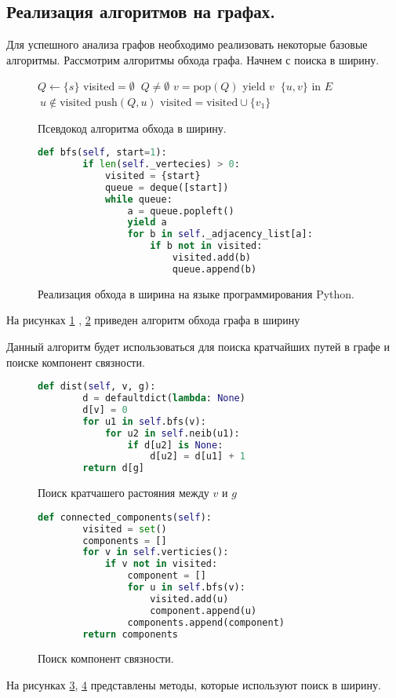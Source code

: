 \subsection{Реализация алгоритмов на графах.}
Для успешного анализа графов необходимо реализовать
некоторые базовые алгоритмы. 
Рассмотрим алгоритмы обхода графа. Начнем с поиска в ширину.
\begin{figure}[H] 
    \begin{algorithmic}
        \State $Q \gets \{s\}$ 
        \State visited$= \emptyset$
        \While $~Q \neq \emptyset$ 
        \State $v = \text{pop}(Q)$
        \State yield $v$
        \For $ ~\{u,v\}$ in $E$
        \If $~u \notin \text{visited}$ 
        \State $\text{push}(Q,u)$
        \State $\text{visited} = \text{visited} \cup \{v_1\}$
        \EndIf
        \EndFor
        \EndWhile
    \end{algorithmic}
    \caption{Псевдокод алгоритма обхода в ширину.}
    \label{psbfs}
\end{figure} 
\begin{figure}[H] 
\begin{lstlisting}[language=Python] 
    def bfs(self, start=1):
        if len(self._vertecies) > 0:
            visited = {start}
            queue = deque([start])
            while queue:
                a = queue.popleft()
                yield a
                for b in self._adjacency_list[a]:
                    if b not in visited:
                        visited.add(b)
                        queue.append(b)
\end{lstlisting}  
    \caption{Реализация обхода в ширина на языке программирования Python.}
    \label{sec:bfspy}
\end{figure} 
На рисунках \ref{psbfs} , \ref{sec:bfspy}
приведен алгоритм обхода графа в ширину

Данный алгоритм будет использоваться для поиска кратчайших путей в графе
и поиске компонент связности.
\begin{figure}[H] 
\begin{lstlisting}[language=Python] 
    def dist(self, v, g):
        d = defaultdict(lambda: None)
        d[v] = 0
        for u1 in self.bfs(v):
            for u2 in self.neib(u1):
                if d[u2] is None:
                    d[u2] = d[u1] + 1
        return d[g]
\end{lstlisting}  
    \caption{Поиск кратчашего растояния между $v$ и  $g$}
    \label{mindist}
\end{figure} 
\begin{figure}[H] 
\begin{lstlisting}[language=Python] 
    def connected_components(self):
        visited = set()
        components = []
        for v in self.verticies():
            if v not in visited:
                component = []
                for u in self.bfs(v):
                    visited.add(u)
                    component.append(u)
                components.append(component)
        return components
\end{lstlisting}  
    \caption{Поиск компонент связности.}
    \label{concomp}
\end{figure} 
На рисунках \ref{mindist}, \ref{concomp}
представлены методы, которые используют поиск в ширину.

